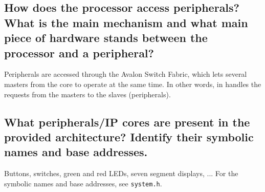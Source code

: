 \documentclass[a4paper,10pt]{article}
\begin{document}
\subsection{How does the processor access peripherals? What is the main mechanism and what main piece of hardware stands between the processor and a peripheral?} 

Peripherals are accessed through the Avalon Switch Fabric, which lets several masters from the core to operate at the same time. In other words, in handles the requests from the masters to the slaves (peripherals).

\subsection{What peripherals/IP cores are present in the provided architecture? Identify their symbolic names and base addresses.}

Buttons, switches, green and red LEDs, seven segment displays, ...
For the symbolic names and base addresses, see \texttt{system.h}.
\end{document}
